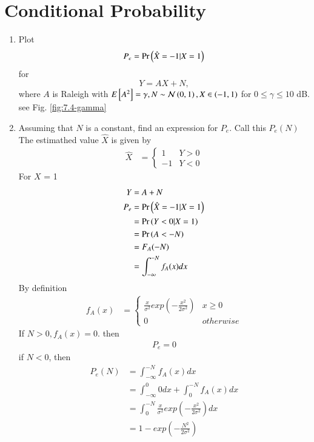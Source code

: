 \documentclass[journal,12pt,twocolumn]{IEEEtran}
\renewcommand\thesection{\arabic{section}}
\begin{document}
\section{Conditional Probability}
\begin{enumerate}[label=\thesection.\arabic*
,ref=\thesection.\theenumi]
\item
\label{ch4_sim}
Plot 
\begin{equation}
P_e = \Pr\left(\hat{X} = -1|X=1\right)
\end{equation}
%
for 
\begin{equation}
Y = AX+N,
\end{equation}
where $A$ is Raleigh with $E{}\left[A^2\right] = \gamma, N \sim \mathcal{N}\left(0,1\right), X \in \left(-1,1\right)$ for $0 \le \gamma \le 10$ dB.\\
%
\solution see Fig. \ref{fig:7.4-gamma}\\
\item
Assuming that $N$ is a constant, find an expression for $P_e$.  Call this $P_e(N)$\\
%
\solution   The estimathed value $\hat{X}$ is given by 
\begin{align}
    \hat{X} &=
    \begin{cases}
        1  &Y>0
        \\
        -1 &Y<0
    \end{cases}
\end{align}
For $X$ = 1
\begin{align}
    Y &= A + N \\
    P_e &= \Pr\left(\hat{X} = -1|X=1\right)\\
    &=\Pr\left(Y<0|X=1\right) \\
    &=\Pr\left(A < -N\right) \\
    &= F_A(-N)\\
    &= \int_{-\infty}^{-N}f_A(x)dx
\end{align}
By definition 
\begin{align}
    f_A(x) &=
    \begin{cases}
        \frac{x}{\sigma^2} exp(-\frac{x^2}{2\sigma^2}) & x\ge 0
        \\
        0 & otherwise
    \end{cases}
\end{align}
If $N > 0, f_A(x) = 0$. then 
\begin{align}
    P_e = 0
\end{align}
if $N < 0$, then 
\begin{align}
    P_e(N) &= \int_{-\infty}^{-N}f_A(x)dx \\
    &= \int_{-\infty}^{0}0dx + \int_{0}^{-N}f_A(x)dx\\
    &= \int_{0}^{-N}\frac{x}{\sigma^2} exp(-\frac{x^2}{2\sigma^2}) dx\\
    &=1 - exp(-\frac{N^2}{2\sigma^2})
\end{align}


\end{enumerate}
\end{document}
